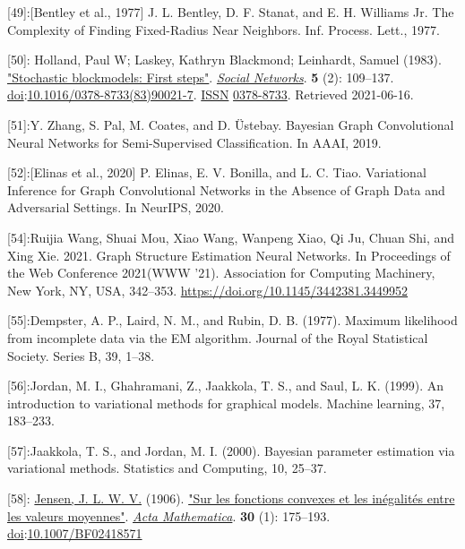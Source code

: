 \documentclass[
]{article}
\begin{document}
{[}49{]}:{[}Bentley et al., 1977{]} J. L. Bentley, D. F. Stanat, and E.
H. Williams Jr. The Complexity of Finding Fixed-Radius Near Neighbors.
Inf. Process. Lett., 1977.

{[}50{]}: Holland, Paul W; Laskey, Kathryn Blackmond; Leinhardt, Samuel
(1983). \href{https://doi.org/10.1016/0378-8733(83)90021-7}{"Stochastic
blockmodels: First steps"}.
\emph{\href{https://en.wikipedia.org/wiki/Social_Networks}{Social
Networks}}. \textbf{5} (2): 109--137.
\href{https://en.wikipedia.org/wiki/Doi_(identifier)}{doi}:\href{https://doi.org/10.1016\%2F0378-8733(83)90021-7}{10.1016/0378-8733(83)90021-7}.
\href{https://en.wikipedia.org/wiki/ISSN_(identifier)}{ISSN}
\href{https://www.worldcat.org/issn/0378-8733}{0378-8733}. Retrieved
2021-06-16.

{[}51{]}:Y. Zhang, S. Pal, M. Coates, and D. Üstebay. Bayesian Graph
Convolutional Neural Networks for Semi-Supervised Classification. In
AAAI, 2019.

{[}52{]}:{[}Elinas et al., 2020{]} P. Elinas, E. V. Bonilla, and L. C.
Tiao. Variational Inference for Graph Convolutional Networks in the
Absence of Graph Data and Adversarial Settings. In NeurIPS, 2020.

{[}54{]}:Ruijia Wang, Shuai Mou, Xiao Wang, Wanpeng Xiao, Qi Ju, Chuan
Shi, and Xing Xie. 2021. Graph Structure Estimation Neural Networks. In
Proceedings of the Web Conference 2021(WWW '21). Association for
Computing Machinery, New York, NY, USA, 342--353.
\url{https://doi.org/10.1145/3442381.3449952}

{[}55{]}:Dempster, A. P., Laird, N. M., and Rubin, D. B. (1977). Maximum
likelihood from incomplete data via the EM algorithm. Journal of the
Royal Statistical Society. Series B, 39, 1--38.

{[}56{]}:Jordan, M. I., Ghahramani, Z., Jaakkola, T. S., and Saul, L. K.
(1999). An introduction to variational methods for graphical models.
Machine learning, 37, 183--233.

{[}57{]}:Jaakkola, T. S., and Jordan, M. I. (2000). Bayesian parameter
estimation via variational methods. Statistics and Computing, 10,
25--37.

{[}58{]}:
\href{https://en.wikipedia.org/wiki/Johan_Jensen_(mathematician)}{Jensen,
J. L. W. V.} (1906). \href{https://zenodo.org/record/2371297}{"Sur les
fonctions convexes et les inégalités entre les valeurs moyennes"}.
\emph{\href{https://en.wikipedia.org/wiki/Acta_Mathematica}{Acta
Mathematica}}. \textbf{30} (1): 175--193.
\href{https://en.wikipedia.org/wiki/Doi_(identifier)}{doi}:\href{https://doi.org/10.1007\%2FBF02418571}{10.1007/BF02418571}
\end{document}
